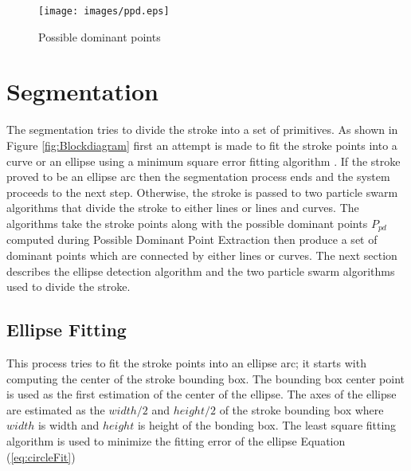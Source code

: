 \begin{figure}
	\centering
		\texttt{[image: images/ppd.eps]}
	\caption{Possible dominant points}%
	\label{fig:LabelsPPD}
\end{figure}

\section{Segmentation}
\label{sec:Segmentation}
The segmentation tries to divide the stroke into a set of primitives. As shown in Figure \ref{fig:Blockdiagram} first an attempt is made to fit the stroke points into a curve or an ellipse using a minimum square error fitting algorithm \cite{chernov-2003}. If the stroke proved to be an ellipse arc then the segmentation process ends and the system proceeds to the next step. Otherwise, the stroke is passed to two particle swarm algorithms that divide the stroke to either lines or lines and curves. The algorithms take the stroke points along with the possible dominant points $P_{pd}$ computed during Possible Dominant Point Extraction then produce a set of dominant points which are connected by either lines or curves. The next section describes the ellipse detection algorithm and the two particle swarm algorithms used to divide the stroke.


\subsection{Ellipse Fitting }
\label{sec:EllipseDetection}

This process tries to fit the stroke points into an ellipse arc; it starts with computing the center of the stroke bounding box. The bounding box center point is used as the first estimation of the center of the ellipse. The axes of the ellipse are estimated as the $width/2$ and $height/2$ of the stroke bounding box where $width$ is width and $height$ is height of the bonding box. The least square fitting algorithm \cite{chernov-2003} is used to minimize the fitting error of the ellipse Equation (\ref{eq:circleFit})  

